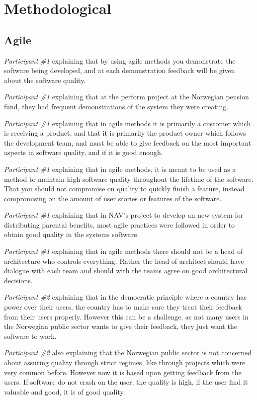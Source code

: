 \section{Methodological}
\subsection{Agile}
\textit{Participant \#1} explaining that by using agile methods you demonstrate the software being developed, and at each demonstration feedback will be given about the software quality.

\textit{Participant \#1} explaining that at the perform project at the Norwegian pension fund, they had frequent demonstrations of the system they were creating.

\textit{Participant \#1} explaining that in agile methods it is primarily a customer which is receiving a product, and that it is primarily the product owner which follows the development team, and must be able to give feedback on the most important aspects in software quality, and if it is good enough.

\textit{Participant \#1} explaining that in agile methods, it is meant to be used as a method to maintain high software quality throughout the lifetime of the software. That you should not compromise on quality to quickly finish a feature, instead compromising on the amount of user stories or features of the software.

\textit{Participant \#1} explaining that in NAV's project to develop an new system for distributing parental benefits, most agile practices were followed in order to obtain good quality in the systems software.

\textit{Participant \#1} explaining that in agile methods there should not be a head of architecture who controls everything. Rather the head of architect should have dialogue with each team and should with the teams agree on good architectural decisions. 

\textit{Participant \#2} explaining that in the democratic principle where a country has power over their users, the country has to make sure they treat their feedback from their users properly. However this can be a challenge, as not many users in the Norwegian public sector wants to give their feedback, they just want the software to work.

\textit{Participant \#2} also explaining that the Norwegian public sector is not concerned about assuring quality through strict regimes, like through projects which were very common before. However now it is based upon getting feedback from the users. If software do not crash on the user, the quality is high, if the user find it valuable and good, it is of good quality.

